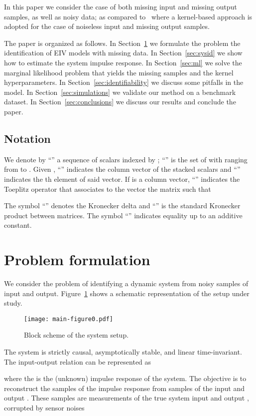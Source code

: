\documentclass[10pt]{article}
\begin{document}
In this paper we consider the case of both missing input and missing output
samples, as well as noisy data; as compared to~\cite{pillonetto2009bayesian}
where a kernel-based approach is adopted for the case of noiseless input and
missing output samples.

The paper is organized as follows. In Section~\ref{sec:formulation} we
formulate the problem the identification of EIV models with missing data. In
Section~\ref{sec:sysid} we show how to estimate the system impulse response. In
Section~\ref{sec:ml} we solve the marginal likelihood problem that yields the
missing samples and the kernel hyperparameters. In
Section~\ref{sec:identifiability} we discuss some pitfalls in the model. In
Section~\ref{sec:simulations} we validate our method on a benchmark dataset. In
Section~\ref{sec:conclusions} we discuss our results and conclude the paper.

\subsection{Notation}
We denote by ``'' a sequence of scalars  indexed by ;
``''
is the set of  with  ranging from  to . Given
,
``'' indicates the column vector of the stacked scalars and
``'' indicates the th element of said vector. If  is a column
vector, ``'' indicates the Toeplitz operator that associates
to the vector  the  matrix  such that

The symbol ``'' denotes the Kronecker delta and ``'' is the
standard Kronecker product between matrices. The symbol ``'' indicates
equality up to an additive constant.

\section{Problem formulation}\label{sec:formulation}
We consider the problem of identifying a dynamic system
from noisy samples of input and output. Figure~\ref{fig:block_scheme} shows a
schematic representation of the setup under study.
\begin{figure}[htb]
  \centering
  \texttt{[image: main-figure0.pdf]}
  \caption{Block scheme of the system setup.}\label{fig:block_scheme}
\end{figure}
The system is strictly causal, asymptotically stable, and linear
time-invariant. The input-output relation can be represented as

where the  is the (unknown) impulse response
of the system. The objective is to reconstruct
the samples of the impulse response from  samples of
the input  and output . These samples
are measurements of the true system input  and output , corrupted by
sensor noises
\end{document}
